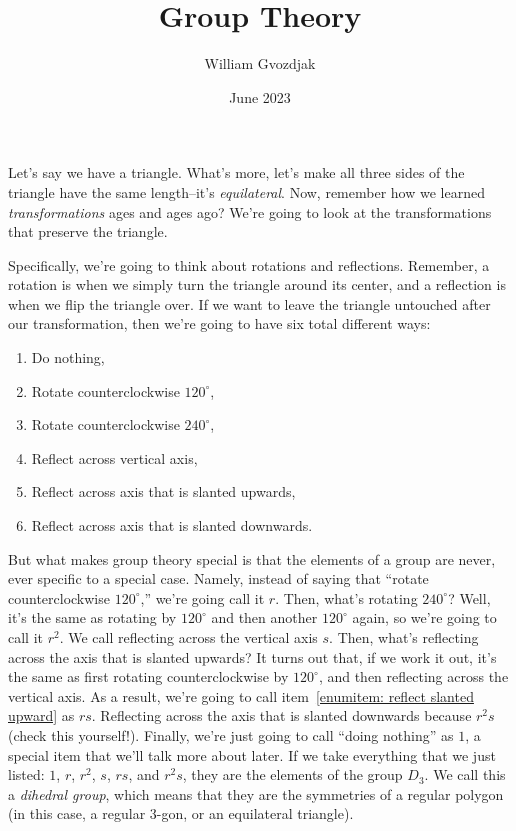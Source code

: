 \documentclass{article}
\title{Group Theory}
\author{William Gvozdjak}
\date{June 2023}
\begin{document}
\maketitle

Let's say we have a triangle. What's more, let's make all three sides of the triangle have the same length--it's \emph{equilateral}. Now, remember how we learned \emph{transformations} ages and ages ago? We're going to look at the transformations that preserve the triangle.

Specifically, we're going to think about rotations and reflections. Remember, a rotation is when we simply turn the triangle around its center, and a reflection is when we flip the triangle over. If we want to leave the triangle untouched after our transformation, then we're going to have six total different ways:
\begin{enumerate}
    \item Do nothing,
    \item Rotate counterclockwise $120^\circ$,
    \item Rotate counterclockwise $240^\circ$,
    \item Reflect across vertical axis,
    \item Reflect across axis that is slanted upwards\label{enumitem: reflect slanted upward},
    \item Reflect across axis that is slanted downwards.
\end{enumerate}

But what makes group theory special is that the elements of a group are never, ever specific to a special case. Namely, instead of saying that ``rotate counterclockwise $120^\circ$,'' we're going call it $r$. Then, what's rotating $240^\circ$? Well, it's the same as rotating by $120^\circ$ and then another $120^\circ$ again, so we're going to call it $r^2$. We call reflecting across the vertical axis $s$. Then, what's reflecting across the axis that is slanted upwards? It turns out that, if we work it out, it's the same as first rotating counterclockwise by $120^\circ$, and then reflecting across the vertical axis. As a result, we're going to call item~\ref{enumitem: reflect slanted upward} as $rs$. Reflecting across the axis that is slanted downwards because $r^2s$ (check this yourself!). Finally, we're just going to call ``doing nothing'' as $1$, a special item that we'll talk more about later. If we take everything that we just listed: $1$, $r$, $r^2$, $s$, $rs$, and $r^2s$, they are the elements of the group $D_3$. We call this a \emph{dihedral group}, which means that they are the symmetries of a regular polygon (in this case, a regular $3$-gon, or an equilateral triangle).
\end{document}
